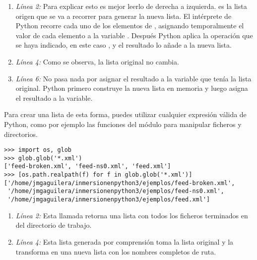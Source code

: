 \begin{enumerate}

\item \emph{Línea 2:} Para explicar esto es mejor leerlo de derecha a izquierda.  es la lista origen que se va a recorrer para generar la nueva lista. El intérprete de Python recorre cada uno de los elementos de , asignando temporalmente el valor de cada elemento a la variable . Después Python aplica la operación que se haya indicado, en este caso , y el resultado lo añade a la nueva lista.

\item \emph{Línea 4:} Como se observa, la lista original no cambia.

\item \emph{Línea 6:} No pasa nada por asignar el resultado a la variable que tenía la lista original. Python primero construye la nueva lista en memoria y luego asigna el resultado a la variable.

\end{enumerate}

Para crear una lista de esta forma, puedes utilizar cualquier expresión válida de Python, como por ejemplo las funciones del módulo  para manipular ficheros y directorios.

\noindent\begin{minipage}{\textwidth}
\begin{lstlisting}[mathescape=True]
>>> import os, glob
>>> glob.glob('*.xml')
['feed-broken.xml', 'feed-ns0.xml', 'feed.xml']
>>> [os.path.realpath(f) for f in glob.glob('*.xml')]
['/home/jmgaguilera/inmersionenpython3/ejemplos/feed-broken.xml',
 '/home/jmgaguilera/inmersionenpython3/ejemplos/feed-ns0.xml',
 '/home/jmgaguilera/inmersionenpython3/ejemplos/feed.xml']
\end{lstlisting}
\end{minipage}

\begin{enumerate}

\item \emph{Línea 2:} Esta llamada retorna una lista con todos los ficheros terminados en  del directorio de trabajo.

\item \emph{Línea 4:} Esta lista generada por comprensión toma la lista original y la transforma en una nueva lista con los nombres completos de ruta.

\end{enumerate}

